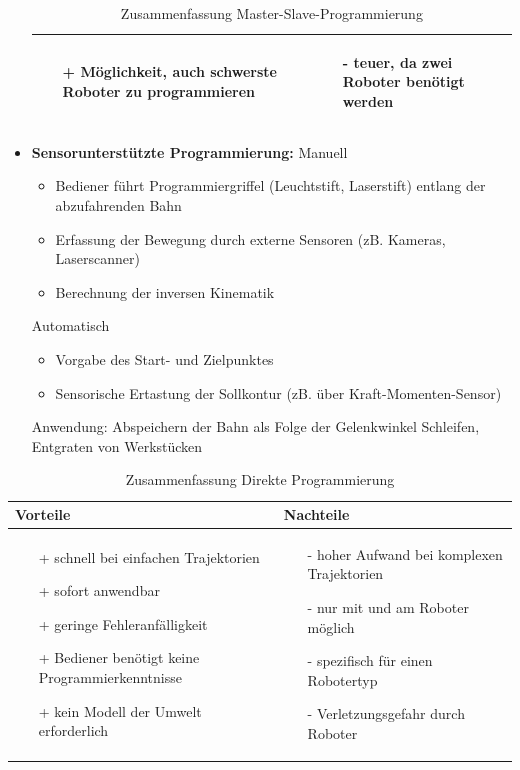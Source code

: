 \begin{itemize}
\begin{table}[hbt]
\begin{tabular}{|p{6.5cm}|p{6.5cm}|}
\begin{itemize}
\setlength\itemsep{0em}
\item[+] Möglichkeit, auch schwerste Roboter zu programmieren
\end{itemize}
 &
 \vspace{-5mm}
\begin{itemize}
\setlength\itemsep{0em}
\item[-] teuer, da zwei Roboter benötigt werden
\end{itemize}\\
\hline
\end{tabular}
\caption{Zusammenfassung Master-Slave-Programmierung}
\label{tab:MSprog}
\end{table}
\item \textbf{Sensorunterstützte Programmierung:}
Manuell
\begin{itemize}
\item Bediener führt Programmiergriffel (Leuchtstift, Laserstift) entlang der
abzufahrenden Bahn
\item Erfassung der Bewegung durch externe Sensoren (zB. Kameras,
Laserscanner)
\item Berechnung der inversen Kinematik
\end{itemize}
Automatisch
\begin{itemize}
\item Vorgabe des Start- und Zielpunktes
\item Sensorische Ertastung der Sollkontur (zB. über Kraft-Momenten-Sensor)
\end{itemize}
Anwendung: Abspeichern der Bahn als Folge der Gelenkwinkel
Schleifen, Entgraten von Werkstücken	
\end{itemize}
\begin{table}[hbt]
\centering
\begin{tabular}{|p{7.5cm}|p{7.5cm}|}
\hline
Vorteile & Nachteile\\
\hline
\vspace{-5mm}
\begin{itemize}
\setlength\itemsep{0em}
\item[+] schnell bei einfachen Trajektorien
\item[+] sofort anwendbar
\item[+] geringe Fehleranfälligkeit
\item[+] Bediener benötigt keine Programmierkenntnisse
\item[+] kein Modell der Umwelt erforderlich
\end{itemize}
 &
 \vspace{-5mm}
\begin{itemize}
\setlength\itemsep{0em}
\item[-] hoher Aufwand bei komplexen Trajektorien
\item[-] nur mit und am Roboter möglich
\item[-] spezifisch für einen Robotertyp
\item[-] Verletzungsgefahr durch Roboter
\end{itemize}\\
\hline
\end{tabular}
\caption{Zusammenfassung Direkte Programmierung}
\label{tab:dirprog}
\end{table}
